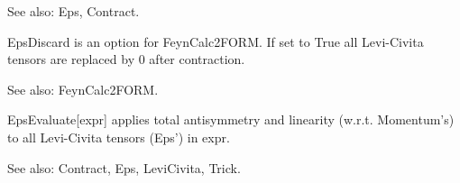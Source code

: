 See also:  Eps, Contract.



\dispSFoutmath{
{{\epsilon }^{\mu \nu \rho \sigma }}
}








EpsDiscard is an option for FeynCalc2FORM. If set to True all Levi-Civita tensors are replaced by 0 after contraction.

See also:  FeynCalc2FORM.



EpsEvaluate[expr] applies total antisymmetry and linearity (w.r.t. Momentum's) to all Levi-Civita tensors (Eps') in expr.

See also:  Contract, Eps, LeviCivita, Trick.






